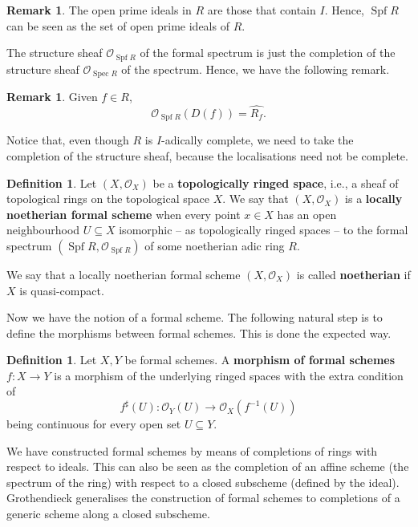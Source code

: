 \documentclass{report}
\DeclareMathOperator{\Spf}{Spf}
\DeclareMathOperator{\Spec}{Spec}
\theoremstyle{definition}
\newtheorem{definition}[equation]{Definition}
\newtheorem{remark}[equation]{Remark}
\begin{document}
\begin{remark}
The open prime ideals in $R$ are those that contain $I$. Hence, $\Spf R$ can be seen as the set of open prime ideals of $R$.
\end{remark}

The structure sheaf $\mathcal{O}_{\Spf R}$ of the formal spectrum is just the completion of the structure sheaf $\mathcal{O}_{\Spec R}$ of the spectrum. Hence, we have the following remark.

\begin{remark}
Given $f\in R$,
\[\mathcal{O}_{\Spf R}(D(f))=\widehat{R_f}.\]
\end{remark}

Notice that, even though $R$ is $I$-adically complete, we need to take the completion of the structure sheaf, because the localisations need not be complete.

\begin{definition}
Let $(X,\mathcal{O}_X)$ be a \textbf{topologically ringed space}, i.e., a sheaf of topological rings on the topological space $X$. We say that $(X,\mathcal{O}_X)$ is a \textbf{locally noetherian formal scheme} when every point $x\in X$ has an open neighbourhood $U\subseteq X$ isomorphic -- as topologically ringed spaces -- to the formal spectrum $(\Spf R,\mathcal{O}_{\Spf R})$ of some noetherian adic ring $R$.

We say that a locally noetherian formal scheme $(X,\mathcal{O}_X)$ is called \textbf{noetherian} if $X$ is quasi-compact. 
\end{definition}

Now we have the notion of a formal scheme. The following natural step is to define the morphisms between formal schemes. This is done the expected way.

\begin{definition}
Let $X,Y$ be formal schemes. A \textbf{morphism of formal schemes} $f:X\rightarrow Y$ is a morphism of the underlying ringed spaces with the extra condition of
\[f^{\sharp}(U):\mathcal{O}_Y(U)\longrightarrow\mathcal{O}_X(f^{-1}(U))\]
being continuous for every open set $U\subseteq Y$.
\end{definition}

We have constructed formal schemes by means of completions of rings with respect to ideals. This can also be seen as the completion of an affine scheme (the spectrum of the ring) with respect to a closed subscheme (defined by the ideal). Grothendieck \cite[Section~2]{grothendieck1960geometrie} generalises the construction of formal schemes to completions of a generic scheme along a closed subscheme.
\end{document}
